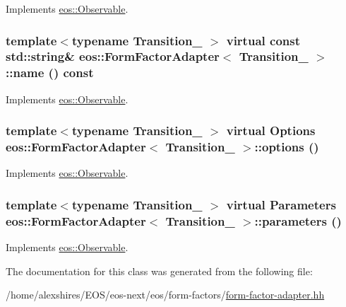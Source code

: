 Implements \hyperlink{classeos_1_1Observable_a8bfd8cc2873e467ac9ae100d029d8c49}{eos::Observable}.\hypertarget{classeos_1_1FormFactorAdapter_ad4b0b6158fcbbdafeae6d62a2326ac92}{
\subsubsection[{name}]{\setlength{\rightskip}{0pt plus 5cm}template$<$typename Transition\_\- $>$ virtual const std::string\& {\bf eos::FormFactorAdapter}$<$ Transition\_\- $>$::name () const}}
\label{classeos_1_1FormFactorAdapter_ad4b0b6158fcbbdafeae6d62a2326ac92}


Implements \hyperlink{classeos_1_1Observable_adfdc8fe469e00adeb464d3b3e4e14236}{eos::Observable}.\hypertarget{classeos_1_1FormFactorAdapter_a758693e9a8fff947fe1500796f1bda4e}{
\subsubsection[{options}]{\setlength{\rightskip}{0pt plus 5cm}template$<$typename Transition\_\- $>$ virtual {\bf Options} {\bf eos::FormFactorAdapter}$<$ Transition\_\- $>$::options ()}}
\label{classeos_1_1FormFactorAdapter_a758693e9a8fff947fe1500796f1bda4e}


Implements \hyperlink{classeos_1_1Observable_a237cf968a4f46a93e0cc8ba0fdbaceee}{eos::Observable}.\hypertarget{classeos_1_1FormFactorAdapter_aa1505da65e397bdda2e59ecfd49e375d}{
\subsubsection[{parameters}]{\setlength{\rightskip}{0pt plus 5cm}template$<$typename Transition\_\- $>$ virtual {\bf Parameters} {\bf eos::FormFactorAdapter}$<$ Transition\_\- $>$::parameters ()}}
\label{classeos_1_1FormFactorAdapter_aa1505da65e397bdda2e59ecfd49e375d}


Implements \hyperlink{classeos_1_1Observable_a233852d22f287944b8bbf4da803289b1}{eos::Observable}.

The documentation for this class was generated from the following file:\begin{DoxyCompactItemize}
\item 
/home/alexshires/EOS/eos-\/next/eos/form-\/factors/\hyperlink{form-factor-adapter_8hh}{form-\/factor-\/adapter.hh}\end{DoxyCompactItemize}
